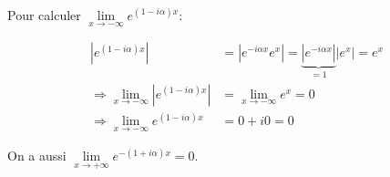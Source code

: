 \newpage

\begin{remark}
    Pour calculer
    $\lim\limits_{x \rightarrow -\infty} e^{(1 - i \alpha) x}$:
    
    \begin{align*}
    \left|e^{(1 - i \alpha) x}\right|
    &= \left|e^{- i \alpha x} e^x\right|
    = \underbrace{\left|e^{- i \alpha x}\right|}_{= 1} \left|e^x\right|
    = e^x\\
    \Rightarrow \lim\limits_{x \rightarrow -\infty} \left|e^{(1 - i \alpha) x}\right|
    &= \lim\limits_{x \rightarrow -\infty} e^x
    = 0\\
    \Rightarrow \lim\limits_{x \rightarrow -\infty} e^{(1 - i \alpha) x}
    &= 0 + i0
    = 0
    \end{align*}
    
    On a aussi $\lim\limits_{x \rightarrow +\infty} e^{-(1 + i \alpha) x} = 0$.
\end{remark}


